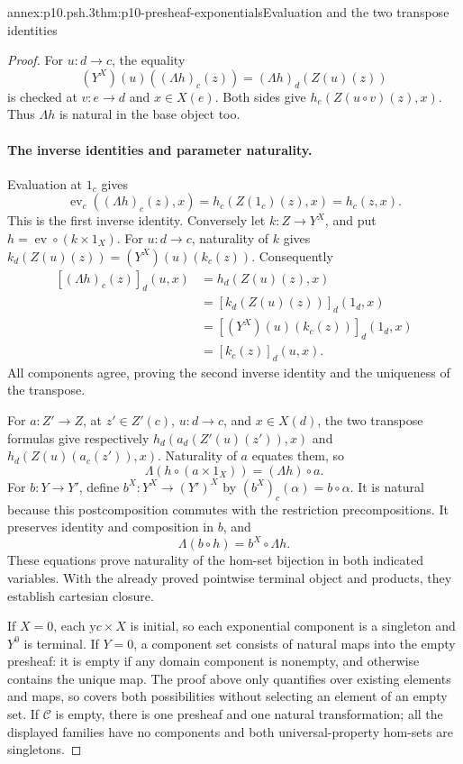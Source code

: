 \begin{annexitem}{annex:p10.psh.3}{thm:p10-presheaf-exponentials}{Evaluation and the two transpose identities}
\begin{proof}
For \(u:d\to c\), the equality
\[
                 (Y^X)(u)((\Lambda h)_c(z))
                           =(\Lambda h)_d(Z(u)(z))
\]
is checked at \(v:e\to d\) and \(x\in X(e)\).
Both sides give \(h_e(Z(u\circ v)(z),x)\).
Thus \(\Lambda h\) is natural in the base object too.

\paragraph{The inverse identities and parameter naturality.}
Evaluation at \(1_c\) gives
\[
     \operatorname{ev}_c((\Lambda h)_c(z),x)
                     =h_c(Z(1_c)(z),x)=h_c(z,x).
\]
This is the first inverse identity.
Conversely let \(k:Z\to Y^X\), and put
\(h=\operatorname{ev}\circ(k\times1_X)\).
For \(u:d\to c\), naturality of \(k\) gives
\(k_d(Z(u)(z))=(Y^X)(u)(k_c(z))\).
Consequently
\[
\begin{aligned}
 [(\Lambda h)_c(z)]_d(u,x)
   &=h_d(Z(u)(z),x)\\
   &=[k_d(Z(u)(z))]_d(1_d,x)\\
   &=[(Y^X)(u)(k_c(z))]_d(1_d,x)\\
   &=[k_c(z)]_d(u,x).
\end{aligned}
\]
All components agree, proving the second inverse identity and
the uniqueness of the transpose.

For \(a:Z'\to Z\), at \(z'\in Z'(c)\), \(u:d\to c\), and
\(x\in X(d)\), the two transpose formulas give respectively
\(h_d(a_d(Z'(u)(z')),x)\) and
\(h_d(Z(u)(a_c(z')),x)\).  Naturality of \(a\) equates them,
so
\[
            \Lambda(h\circ(a\times1_X))=(\Lambda h)\circ a.
\]
For \(b:Y\to Y'\), define \(b^X:Y^X\to(Y')^X\) by
\((b^X)_c(\alpha)=b\circ\alpha\).
It is natural because this postcomposition commutes with the
restriction precompositions.  It preserves identity and composition
in \(b\), and
\[
                            \Lambda(b\circ h)=b^X\circ\Lambda h.
\]
These equations prove naturality of the hom-set bijection in
both indicated variables.  With the already proved pointwise
terminal object and products, they establish cartesian closure.

If \(X=0\), each \(\mathrm y c\times X\) is initial, so each
exponential component is a singleton and \(Y^0\) is terminal.
If \(Y=0\), a component set consists of natural maps into the
empty presheaf: it is empty if any domain component is nonempty,
and otherwise contains the unique map.  The proof above only
quantifies over existing elements and maps, so covers both
possibilities without selecting an element of an empty set.
If \(\mathcal C\) is empty, there is one presheaf and one
natural transformation; all the displayed families have no
components and both universal-property hom-sets are singletons.
\end{proof}
\end{annexitem}

